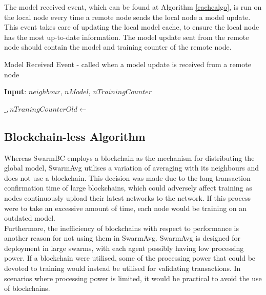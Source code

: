\documentclass[letterpaper, 10 pt, conference]{ieeeconf}  %
\begin{document}
The model received event, which can be found at Algorithm \ref{cachealgo}, is run on the local node every time a remote node sends the local node a model update. This event takes care of updating the local model cache, to ensure the local node has the most up-to-date information. The model update sent from the remote node should contain the model and training counter of the remote node.

\begin{algorithm}[H]
	\caption{Model Received Event - called when a model update is received from a remote node} \label{cachealgo}
	\textbf{Input}: $neighbour$, $nModel$, $nTrainingCounter$
	\newline
	\begin{algorithmic}[1]
		\State $\_, nTraningCounterOld \gets$ 
		\State {}
		\EndIf
		\Else
		\State {}
		\EndIf
	\end{algorithmic}
\end{algorithm}

\subsection{Blockchain-less Algorithm}
Whereas SwarmBC employs a blockchain as the mechanism for distributing the global model, SwarmAvg utilises a variation of averaging with its neighbours and does not use a blockchain. This decision was made due to the long transaction confirmation time of large blockchains, which could adversely affect training as nodes continuously upload their latest networks to the network. If this process were to take an excessive amount of time, each node would be training on an outdated model. \\

Furthermore, the inefficiency of blockchains with respect to performance is another reason for not using them in SwarmAvg. SwarmAvg is designed for deployment in large swarms, with each agent possibly having low processing power. If a blockchain were utilised, some of the processing power that could be devoted to training would instead be utilised for validating transactions. In scenarios where processing power is limited, it would be practical to avoid the use of blockchains.
\end{document}
